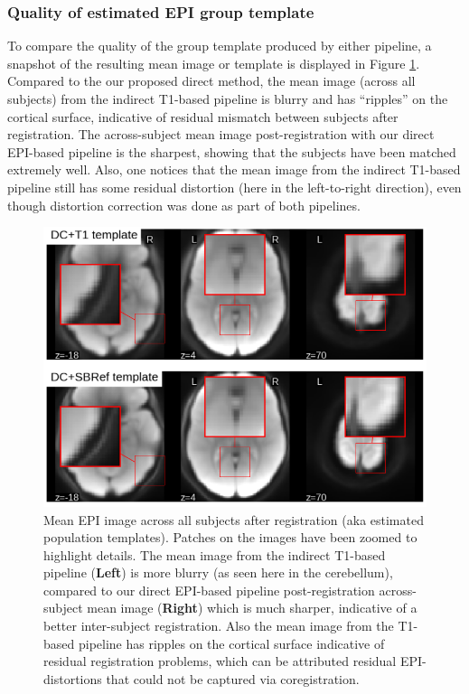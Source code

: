 \subsubsection{Quality of estimated EPI group template}
To compare the quality of the group template produced by either pipeline, a snapshot of the resulting mean image or template is displayed in
Figure \ref{fig:template}. Compared to the our proposed direct method,
the mean image (across all subjects) from the indirect T1-based
pipeline is blurry and has ``ripples'' on the cortical surface,
indicative of residual mismatch between subjects after
registration. The across-subject mean image post-registration with our
direct EPI-based pipeline is the sharpest, showing that the subjects
have been matched extremely well. Also, one notices that the mean image from
the indirect T1-based pipeline still has some residual distortion (here in the
left-to-right direction), even though distortion correction was done as part of both pipelines.

\begin{figure}[!htbp]
  \includegraphics[width=1\linewidth]{figures/template.png}
\caption{Mean EPI image
  across all subjects after registration (aka estimated population
  templates). Patches on the images have been zoomed to highlight
  details. The mean image from the indirect T1-based
  pipeline (\textbf{Left}) is more blurry (as seen here in the
  cerebellum), compared to
  our direct EPI-based pipeline post-registration across-subject mean
  image (\textbf{Right}) which is much sharper, indicative of a
  better inter-subject
  registration. Also the mean image from the T1-based pipeline has
  ripples on the cortical surface indicative of residual registration
  problems, which can be attributed residual EPI-distortions that
  could not be captured via coregistration.}
\label{fig:template}
\end{figure}

